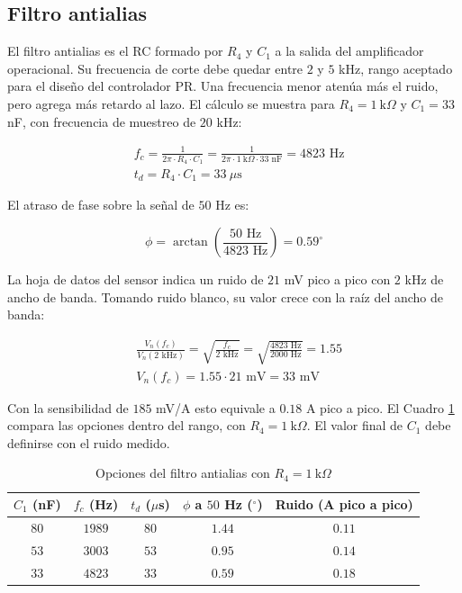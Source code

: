 \documentclass[spanish,10pt,a4paper,titlepage]{article}
\begin{document}
	\subsection{Filtro antialias}
	El filtro antialias es el RC formado por $R_4$ y $C_1$ a la salida del amplificador operacional. Su frecuencia de corte debe quedar entre $2$ y $5$ kHz, rango aceptado para el diseño del controlador PR. Una frecuencia menor atenúa más el ruido, pero agrega más retardo al lazo. El cálculo se muestra para $R_4 = 1\ \text{k}\Omega$ y $C_1 = 33$ nF, con frecuencia de muestreo de $20$ kHz:

	\begin{align*}
		&f_c = \frac{1}{2\pi \cdot R_4 \cdot C_1} = \frac{1}{2\pi \cdot 1\ \text{k}\Omega \cdot 33 \text{ nF}} = 4823 \text{ Hz}\\
		&t_d = R_4 \cdot C_1 = 33\ \mu\text{s}
	\end{align*}

	El atraso de fase sobre la señal de $50$ Hz es:

	\[\phi = \arctan\left(\frac{50 \text{ Hz}}{4823 \text{ Hz}}\right) = 0.59^\circ\]

	La hoja de datos del sensor indica un ruido de $21$ mV pico a pico con $2$ kHz de ancho de banda. Tomando ruido blanco, su valor crece con la raíz del ancho de banda:

	\begin{align*}
		&\frac{V_{n}(f_c)}{V_{n}(2 \text{ kHz})} = \sqrt{\frac{f_c}{2 \text{ kHz}}} = \sqrt{\frac{4823 \text{ Hz}}{2000 \text{ Hz}}} = 1.55\\
		&V_{n}(f_c) = 1.55 \cdot 21 \text{ mV} = 33 \text{ mV}
	\end{align*}

	Con la sensibilidad de $185$ mV/A esto equivale a $0.18$ A pico a pico. El Cuadro \ref{tab:antialias} compara las opciones dentro del rango, con $R_4 = 1\ \text{k}\Omega$. El valor final de $C_1$ debe definirse con el ruido medido.

	\begin{table}[H]
		\centering
		\caption{Opciones del filtro antialias con $R_4 = 1\ \text{k}\Omega$}
		\label{tab:antialias}
		\begin{tabular}{ccccc}
			\hline
			$C_1$ (nF) & $f_c$ (Hz) & $t_d$ ($\mu$s) & $\phi$ a $50$ Hz ($^\circ$) & Ruido (A pico a pico) \\
			\hline
			$80$ & $1989$ & $80$ & $1.44$ & $0.11$ \\
			$53$ & $3003$ & $53$ & $0.95$ & $0.14$ \\
			$33$ & $4823$ & $33$ & $0.59$ & $0.18$ \\
			\hline
		\end{tabular}
	\end{table}
\end{document}
